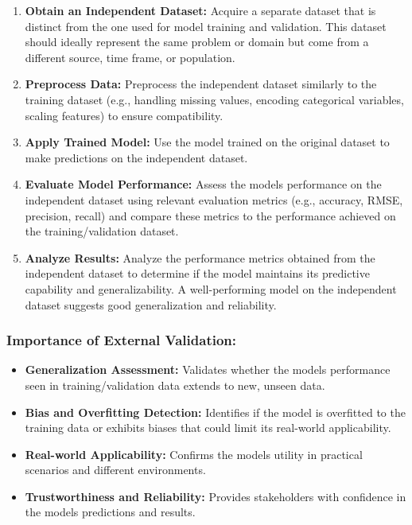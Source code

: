 \documentclass[
]{article}
\begin{document}
\begin{enumerate}
\def\labelenumi{\arabic{enumi}.}
\item
  \textbf{Obtain an Independent Dataset:} Acquire a separate dataset
  that is distinct from the one used for model training and validation.
  This dataset should ideally represent the same problem or domain but
  come from a different source, time frame, or population.
\item
  \textbf{Preprocess Data:} Preprocess the independent dataset similarly
  to the training dataset (e.g., handling missing values, encoding
  categorical variables, scaling features) to ensure compatibility.
\item
  \textbf{Apply Trained Model:} Use the model trained on the original
  dataset to make predictions on the independent dataset.
\item
  \textbf{Evaluate Model Performance:} Assess the
  model\textquotesingle s performance on the independent dataset using
  relevant evaluation metrics (e.g., accuracy, RMSE, precision, recall)
  and compare these metrics to the performance achieved on the
  training/validation dataset.
\item
  \textbf{Analyze Results:} Analyze the performance metrics obtained
  from the independent dataset to determine if the model maintains its
  predictive capability and generalizability. A well-performing model on
  the independent dataset suggests good generalization and reliability.
\end{enumerate}

\hypertarget{importance-of-external-validation}{%
\subsubsection{Importance of External
Validation:}\label{importance-of-external-validation}}

\begin{itemize}
\item
  \textbf{Generalization Assessment:} Validates whether the
  model\textquotesingle s performance seen in training/validation data
  extends to new, unseen data.
\item
  \textbf{Bias and Overfitting Detection:} Identifies if the model is
  overfitted to the training data or exhibits biases that could limit
  its real-world applicability.
\item
  \textbf{Real-world Applicability:} Confirms the
  model\textquotesingle s utility in practical scenarios and different
  environments.
\item
  \textbf{Trustworthiness and Reliability:} Provides stakeholders with
  confidence in the model\textquotesingle s predictions and results.
\end{itemize}
\end{document}
